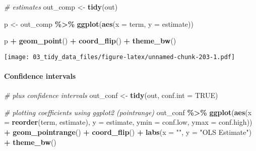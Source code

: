\documentclass[
]{book}
\newenvironment{Shaded}{\begin{snugshade}}{\end{snugshade}}
\newcommand{\CommentTok}[1]{\textcolor[rgb]{0.56,0.35,0.01}{\textit{#1}}}
\newcommand{\DataTypeTok}[1]{\textcolor[rgb]{0.13,0.29,0.53}{#1}}
\newcommand{\KeywordTok}[1]{\textcolor[rgb]{0.13,0.29,0.53}{\textbf{#1}}}
\newcommand{\NormalTok}[1]{#1}
\newcommand{\OperatorTok}[1]{\textcolor[rgb]{0.81,0.36,0.00}{\textbf{#1}}}
\newcommand{\OtherTok}[1]{\textcolor[rgb]{0.56,0.35,0.01}{#1}}
\newcommand{\StringTok}[1]{\textcolor[rgb]{0.31,0.60,0.02}{#1}}
\begin{document}
\begin{Shaded}
\begin{Highlighting}[]
\CommentTok{\# estimates}
\NormalTok{out\_comp \textless{}{-}}\StringTok{ }\KeywordTok{tidy}\NormalTok{(out)}

\NormalTok{p \textless{}{-}}\StringTok{ }\NormalTok{out\_comp }\OperatorTok{\%\textgreater{}\%}
\StringTok{  }\KeywordTok{ggplot}\NormalTok{(}\KeywordTok{aes}\NormalTok{(}\DataTypeTok{x =}\NormalTok{ term, }\DataTypeTok{y =}\NormalTok{ estimate))}

\NormalTok{p }\OperatorTok{+}\StringTok{ }\KeywordTok{geom\_point}\NormalTok{() }\OperatorTok{+}
\StringTok{  }\KeywordTok{coord\_flip}\NormalTok{() }\OperatorTok{+}
\StringTok{  }\KeywordTok{theme\_bw}\NormalTok{()}
\end{Highlighting}
\end{Shaded}

\texttt{[image: 03\_tidy\_data\_files/figure-latex/unnamed-chunk-203-1.pdf]}

\hypertarget{confidence-intervals}{%
\paragraph{Confidence intervals}\label{confidence-intervals}}

\begin{Shaded}
\begin{Highlighting}[]
\CommentTok{\# plus confidence intervals}
\NormalTok{out\_conf \textless{}{-}}\StringTok{ }\KeywordTok{tidy}\NormalTok{(out, }\DataTypeTok{conf.int =} \OtherTok{TRUE}\NormalTok{)}

\CommentTok{\# plotting coefficients using ggplot2 (pointrange)}
\NormalTok{out\_conf }\OperatorTok{\%\textgreater{}\%}
\StringTok{  }\KeywordTok{ggplot}\NormalTok{(}\KeywordTok{aes}\NormalTok{(}\DataTypeTok{x =} \KeywordTok{reorder}\NormalTok{(term, estimate), }\DataTypeTok{y =}\NormalTok{ estimate, }\DataTypeTok{ymin =}\NormalTok{ conf.low, }\DataTypeTok{ymax =}\NormalTok{ conf.high)) }\OperatorTok{+}
\StringTok{  }\KeywordTok{geom\_pointrange}\NormalTok{() }\OperatorTok{+}
\StringTok{  }\KeywordTok{coord\_flip}\NormalTok{() }\OperatorTok{+}
\StringTok{  }\KeywordTok{labs}\NormalTok{(}\DataTypeTok{x =} \StringTok{""}\NormalTok{, }\DataTypeTok{y =} \StringTok{"OLS Estimate"}\NormalTok{) }\OperatorTok{+}
\StringTok{  }\KeywordTok{theme\_bw}\NormalTok{()}
\end{Highlighting}
\end{Shaded}
\end{document}
